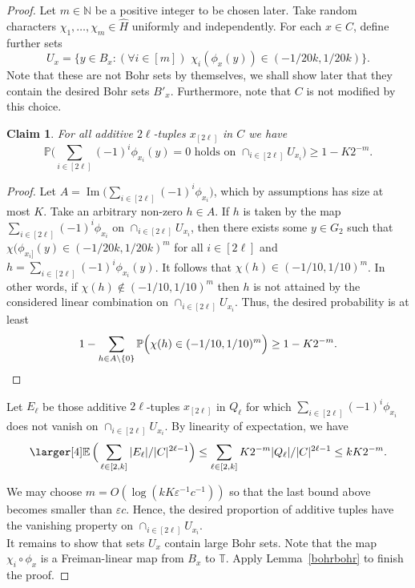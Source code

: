 \documentclass[a4paper,11pt]{article}
\numberwithin{theorem}{section}
\newtheorem{claim}[theorem]{Claim}
\theoremstyle{definition}
\newcommand{\on}[1]{
	\operatorname{#1}
}
\newcommand{\exx}{
  \mathop{
    \mathchoice{\vcenter{\hbox{\larger[4]$\mathbb{E}$}}}
               {\kern0pt\mathbb{E}}
               {\kern0pt\mathbb{E}}
               {\kern0pt\mathbb{E}}
  }\displaylimits
}
\begin{document}
\begin{proof}
    Let $m \in \mathbb{N}$ be a positive integer to be chosen later. Take random characters $\chi_1, \dots, \chi_m \in \hat{H}$ uniformly and independently. For each $x\in C$, define further sets 
    \[U_x = \{y \in B_x : (\forall i \in [m]) \,\,\chi_i(\phi_x(y)) \in (-1/20k, 1/20k)\}.\]
    Note that these are not Bohr sets by themselves, we shall show later that they contain the desired Bohr sets $B'_x$. Furthermore, note that $C$ is not modified by this choice.\\

    \begin{claim}
        For all additive $2\ell$-tuples $x_{[2\ell]}$ in $C$ we have 
            \[\mathbb{P}\Big(\sum_{i \in [2\ell]} (-1)^i \phi_{x_i}(y) = 0\text{ holds on }\cap_{i \in [2\ell]}U_{x_i}\Big) \geq 1 - K 2^{-m}.\]
    \end{claim} 

    \begin{proof}
        Let $A = \on{Im}\Big(\sum_{i \in [2\ell]} (-1)^i \phi_{x_i}\Big)$, which by assumptions has size at most $K$. Take an arbitrary non-zero $h \in A$. If $h$ is taken by the map $\sum_{i \in [2\ell]} (-1)^i \phi_{x_i}$ on $\cap_{i \in [2\ell]}U_{x_i}$, then there exists some $y \in G_2$ such that $\chi(\phi_{x_i]}(y) \in (-1/20k, 1/20k)^m$ for all $i \in [2\ell]$ and $h = \sum_{i \in [2\ell]} (-1)^i \phi_{x_i}(y)$. It follows that $\chi(h) \in (-1/10, 1/10)^m$. In other words, if $\chi(h) \notin (-1/10, 1/10)^m$ then $h$ is not attained by the considered linear combination on $\cap_{i \in [2\ell]}U_{x_i}$. Thus, the desired probability is at least
        \[1 - \sum_{h \in A \setminus \{0\}} \mathbb{P}\Big(\chi(h) \in (-1/10,1/10)^m\Big) \geq 1 - K 2^{-m}.\qedhere\]
    \end{proof}

    Let $E_\ell$ be those additive $2\ell$-tuples $x_{[2\ell]}$ in $Q_\ell$ for which  $\sum_{i \in [2\ell]} (-1)^i \phi_{x_i}$ does not vanish on $\cap_{i \in [2\ell]} U_{x_i}$. By linearity of expectation, we have
    \[\exx\Big(\sum_{\ell \in [2,k]} |E_\ell|/|C|^{2\ell - 1}\Big) \leq \sum_{\ell \in [2,k]}  K 2^{-m} |Q_\ell|/|C|^{2\ell - 1} \leq k K 2^{-m}.\]

    We may choose $m = O(\log(k K \varepsilon^{-1} c^{-1}))$ so that the last bound above becomes smaller than $\varepsilon c$. Hence, the desired proportion of additive tuples have the vanishing property on $\cap_{i \in [2\ell]} U_{x_i}$.\\

    It remains to show that sets $U_x$ contain large Bohr sets. Note that the map $\chi_i \circ \phi_x$ is a Freiman-linear map from $B_x$ to $\mathbb{T}$. Apply Lemma~\ref{bohrbohr} to finish the proof.
\end{proof}
\end{document}
